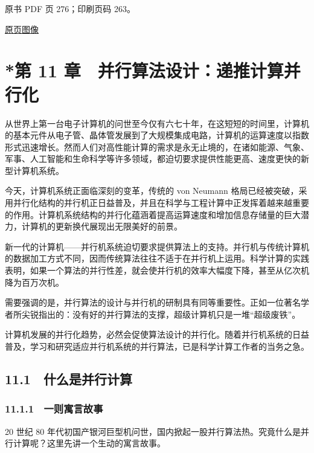 \clearpage

原书 PDF 页 276；印刷页码 263。

\href{source-images/pdf-276.jpeg}{原页图像}

\section{*第 11 章　并行算法设计：递推计算并行化}\label{ch11-ux7b2c-11-ux7ae0-ux5e76ux884cux7b97ux6cd5ux8bbeux8ba1ux9012ux63a8ux8ba1ux7b97ux5e76ux884cux5316}

从世界上第一台电子计算机的问世至今仅有六七十年，在这短短的时间里，计算机的基本元件从电子管、晶体管发展到了大规模集成电路，计算机的运算速度以指数形式迅速增长。然而人们对高性能计算的需求是永无止境的，在诸如能源、气象、军事、人工智能和生命科学等许多领域，都迫切要求提供性能更高、速度更快的新型计算机系统。

今天，计算机系统正面临深刻的变革，传统的 von Neumann 格局已经被突破，采用并行化结构的并行机正日益普及，并且在科学与工程计算中正发挥着越来越重要的作用。计算机系统结构的并行化蕴涵着提高运算速度和增加信息存储量的巨大潜力，计算机的更新换代展现出无限美好的前景。

新一代的计算机------并行机系统迫切要求提供算法上的支持。并行机与传统计算机的数据加工方式不同，因而传统算法往往不适于在并行机上运用。科学计算的实践表明，如果一个算法的并行性差，就会使并行机的效率大幅度下降，甚至从亿次机降为百万次机。

需要强调的是，并行算法的设计与并行机的研制具有同等重要性。正如一位著名学者所尖锐指出的：没有好的并行算法的支撑，超级计算机只是一堆``超级废铁''。

计算机发展的并行化趋势，必然会促使算法设计的并行化。随着并行机系统的日益普及，学习和研究适应并行机系统的并行算法，已是科学计算工作者的当务之急。

\subsection{11.1　什么是并行计算}\label{ch11-ux4ec0ux4e48ux662fux5e76ux884cux8ba1ux7b97}

\subsubsection{11.1.1　一则寓言故事}\label{ch11-ux4e00ux5219ux5bd3ux8a00ux6545ux4e8b}

20 世纪 80 年代初国产银河巨型机问世，国内掀起一股并行算法热。究竟什么是并行计算呢？这里先讲一个生动的寓言故事。

